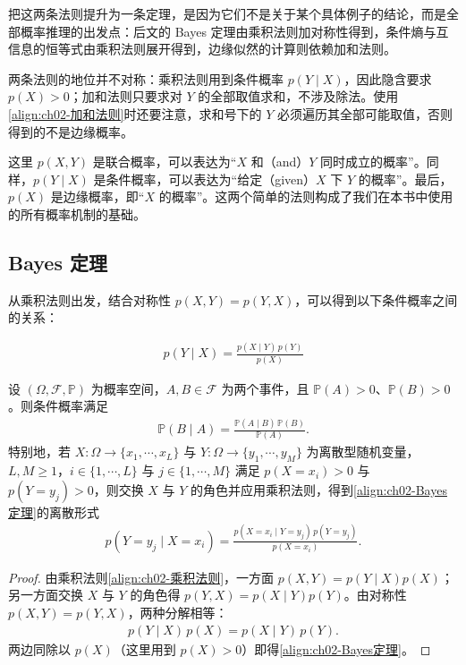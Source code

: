 \documentclass[../../main.tex]{subfiles}
\begin{document}
\begin{remark}
把这两条法则提升为一条定理，是因为它们不是关于某个具体例子的结论，而是全部概率推理的出发点：后文的 Bayes 定理由乘积法则加对称性得到，条件熵与互信息的恒等式由乘积法则展开得到，边缘似然的计算则依赖加和法则。

两条法则的地位并不对称：乘积法则用到条件概率 $p(Y\mid X)$，因此隐含要求 $p(X)>0$；加和法则只要求对 $Y$ 的全部取值求和，不涉及除法。使用\eqref{align:ch02-加和法则}时还要注意，求和号下的 $Y$ 必须遍历其全部可能取值，否则得到的不是边缘概率。
\end{remark}

这里 $p(X,Y)$ 是联合概率，可以表达为“$X$ 和（and）$Y$ 同时成立的概率”。同样，$p(Y\mid X)$ 是条件概率，可以表达为“给定（given）$X$ 下 $Y$ 的概率”。最后，$p(X)$ 是边缘概率，即“$X$ 的概率”。这两个简单的法则构成了我们在本书中使用的所有概率机制的基础。

\subsection{Bayes 定理}\label{subsection:ch02-Bayes定理}

从乘积法则出发，结合对称性 $p(X,Y)=p(Y,X)$，可以得到以下条件概率之间的关系：

\begin{align}
  p(Y\mid X) = \frac{p(X\mid Y)\,p(Y)}{p(X)}
  \label{align:ch02-Bayes定理}
\end{align}

\begin{theorem}[Bayes 定理]\label{theorem:ch02-Bayes定理}
设 $(\Omega,\mathcal{F},\mathbb{P})$ 为概率空间，$A,B\in\mathcal{F}$ 为两个事件，且 $\mathbb{P}(A)>0$、$\mathbb{P}(B)>0$。则条件概率满足
\begin{align*}
  \mathbb{P}(B\mid A)=\frac{\mathbb{P}(A\mid B)\,\mathbb{P}(B)}{\mathbb{P}(A)} .
\end{align*}
特别地，若 $X:\Omega\to\{x_1,\cdots,x_L\}$ 与 $Y:\Omega\to\{y_1,\cdots,y_M\}$ 为离散型随机变量，$L,M\geqslant1$，$i\in\{1,\cdots,L\}$ 与 $j\in\{1,\cdots,M\}$ 满足 $p(X=x_i)>0$ 与 $p(Y=y_j)>0$，则交换 $X$ 与 $Y$ 的角色并应用乘积法则，得到\eqref{align:ch02-Bayes定理}的离散形式
\begin{align*}
  p(Y=y_j\mid X=x_i)=\frac{p(X=x_i\mid Y=y_j)\,p(Y=y_j)}{p(X=x_i)} .
\end{align*}
\end{theorem}

\begin{proof}
由乘积法则\eqref{align:ch02-乘积法则}，一方面 $p(X,Y)=p(Y\mid X)p(X)$；另一方面交换 $X$ 与 $Y$ 的角色得 $p(Y,X)=p(X\mid Y)p(Y)$。由对称性 $p(X,Y)=p(Y,X)$，两种分解相等：
\begin{align*}
 p(Y\mid X)\,p(X) = p(X\mid Y)\,p(Y) .
\end{align*}
两边同除以 $p(X)$（这里用到 $p(X)>0$）即得\eqref{align:ch02-Bayes定理}。
\end{proof}
\end{document}
